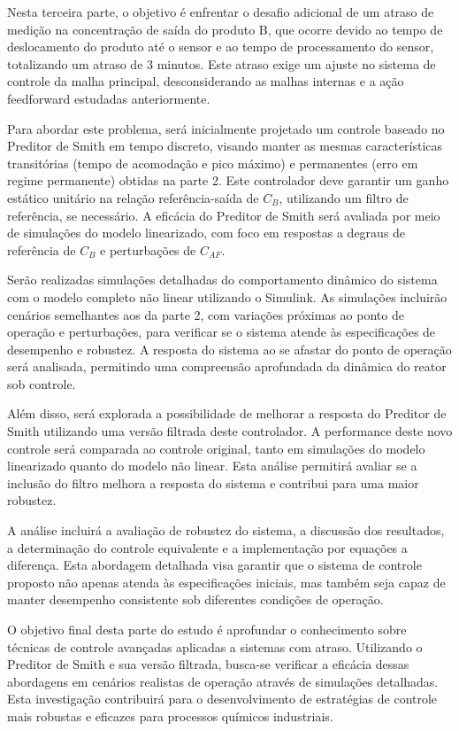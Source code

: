 \documentclass[a4paper,12pt]{article}
\begin{document}
Nesta terceira parte, o objetivo é enfrentar o desafio adicional de um atraso de medição na concentração de saída do produto B, que ocorre devido ao tempo de deslocamento do produto até o sensor e ao tempo de processamento do sensor, totalizando um atraso de 3 minutos. Este atraso exige um ajuste no sistema de controle da malha principal, desconsiderando as malhas internas e a ação feedforward estudadas anteriormente.

Para abordar este problema, será inicialmente projetado um controle baseado no Preditor de Smith em tempo discreto, visando manter as mesmas características transitórias (tempo de acomodação e pico máximo) e permanentes (erro em regime permanente) obtidas na parte 2. Este controlador deve garantir um ganho estático unitário na relação referência-saída de \(C_B\), utilizando um filtro de referência, se necessário. A eficácia do Preditor de Smith será avaliada por meio de simulações do modelo linearizado, com foco em respostas a degraus de referência de \(C_B\) e perturbações de \(C_{AF}\).

Serão realizadas simulações detalhadas do comportamento dinâmico do sistema com o modelo completo não linear utilizando o Simulink. As simulações incluirão cenários semelhantes aos da parte 2, com variações próximas ao ponto de operação e perturbações, para verificar se o sistema atende às especificações de desempenho e robustez. A resposta do sistema ao se afastar do ponto de operação será analisada, permitindo uma compreensão aprofundada da dinâmica do reator sob controle.

Além disso, será explorada a possibilidade de melhorar a resposta do Preditor de Smith utilizando uma versão filtrada deste controlador. A performance deste novo controle será comparada ao controle original, tanto em simulações do modelo linearizado quanto do modelo não linear. Esta análise permitirá avaliar se a inclusão do filtro melhora a resposta do sistema e contribui para uma maior robustez.

A análise incluirá a avaliação de robustez do sistema, a discussão dos resultados, a determinação do controle equivalente e a implementação por equações a diferença. Esta abordagem detalhada visa garantir que o sistema de controle proposto não apenas atenda às especificações iniciais, mas também seja capaz de manter desempenho consistente sob diferentes condições de operação.

O objetivo final desta parte do estudo é aprofundar o conhecimento sobre técnicas de controle avançadas aplicadas a sistemas com atraso. Utilizando o Preditor de Smith e sua versão filtrada, busca-se verificar a eficácia dessas abordagens em cenários realistas de operação através de simulações detalhadas. Esta investigação contribuirá para o desenvolvimento de estratégias de controle mais robustas e eficazes para processos químicos industriais.
\end{document}
